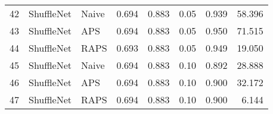 \begin{tabular}{lllrrrrr}
42 &   ShuffleNet &     Naive &  0.694 &  0.883 &   0.05 &     0.939 &  58.396 \\
43 &   ShuffleNet &       APS &  0.694 &  0.883 &   0.05 &     0.950 &  71.515 \\
44 &   ShuffleNet &      RAPS &  0.693 &  0.883 &   0.05 &     0.949 &  19.050 \\
45 &   ShuffleNet &     Naive &  0.694 &  0.883 &   0.10 &     0.892 &  28.888 \\
46 &   ShuffleNet &       APS &  0.694 &  0.883 &   0.10 &     0.900 &  32.172 \\
47 &   ShuffleNet &      RAPS &  0.694 &  0.883 &   0.10 &     0.900 &   6.144 \\
\bottomrule
\end{tabular}
